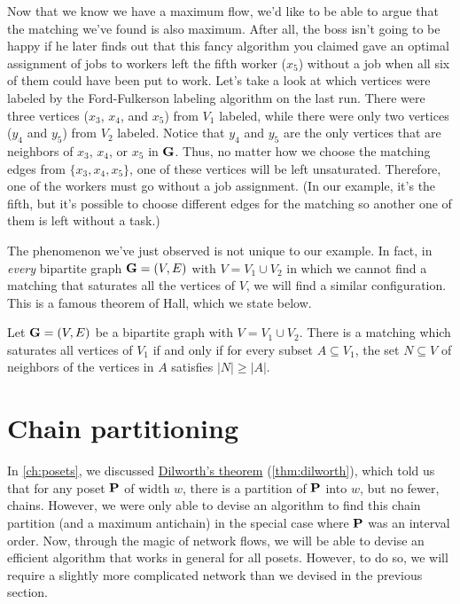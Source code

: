 Now that we know we have a maximum flow, we'd like to be able to argue
that the matching we've found is also maximum. After all, the boss
isn't going to be happy if he later finds out that this fancy
algorithm you claimed gave an optimal assignment of jobs to workers
left the fifth worker ($x_5$) without a job when all six of them could
have been put to work. Let's take a look at which vertices were
labeled by the Ford-Fulkerson labeling algorithm on the last
run. There were three vertices ($x_3$, $x_4$, and $x_5$) from $V_1$
labeled, while there were only two vertices ($y_4$ and $y_5$) from
$V_2$ labeled. Notice that $y_4$ and $y_5$ are the only vertices that
are neighbors of $x_3$, $x_4$, or $x_5$ in $\mathbf{G}$. Thus, no matter how
we choose the matching edges from $\{x_3,x_4,x_5\}$, one of these
vertices will be left unsaturated. Therefore, one of the workers must
go without a job assignment. (In our example, it's the fifth, but it's
possible to choose different edges for the matching so another one of
them is left without a task.)

The phenomenon we've just observed is not unique to our example. In
fact, in \emph{every} bipartite graph $\mathbf{G}=(V,E)$ with $V=V_1\cup V_2$ in
which we cannot find a matching that saturates all the vertices of $V$,
we will find a similar configuration. This is a famous theorem of
Hall, which we state below.

\begin{theorem}[Hall]\label{thm:flowapplications:hall}
  Let $\mathbf{G}=(V,E)$ be a bipartite graph with $V=V_1\cup V_2$. There is a
  matching which saturates all vertices of $V_1$ if and only if for
  every subset $A\subseteq V_1$, the set $N\subseteq V$ of neighbors
  of the vertices in $A$ satisfies $|N|\geq |A|$.
\end{theorem}
\section{Chain partitioning}

In \autoref{ch:posets}, we discussed
\hyperref[thm:dilworth]{Dilworth's theorem} (\autoref{thm:dilworth}),
which told us that for any poset $\mathbf{P}$ of width $w$, there is a
partition of $\mathbf{P}$ into $w$, but no fewer, chains. However, we were
only able to devise an algorithm to find this chain partition (and a
maximum antichain) in the special case where $\mathbf{P}$ was an interval
order. Now, through the magic of network flows, we will be able to
devise an efficient algorithm that works in general for all
posets. However, to do so, we will require a slightly more complicated
network than we devised in the previous section.

